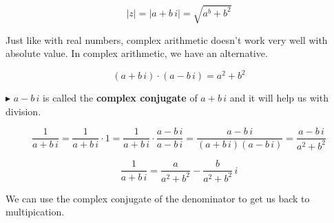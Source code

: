 \documentclass{ximera}
\begin{document}
\[    |z| = |a + b \, i| = \sqrt{a^b + b^2}          \]



Just like with real numbers, complex arithmetic doesn't work very well with absolute value. In complex arithmetic, we have an alternative.



\[   (a + b \, i) \cdot    (a - b \, i)  = a^2 + b^2   \]



$\blacktriangleright$  $a - b \, i$ is called the \textbf{complex conjugate} of $a + b \, i$ and it will help us with division.




\[   \frac{1}{a + b \, i} =   \frac{1}{a + b \, i} \cdot 1 = \frac{1}{a + b \, i} \cdot \frac{a - b \, i}{a - b \, i}  =  \frac{a - b \, i}{(a + b \, i)(a - b \, i)} =   \frac{a - b \, i}{a^2 + b^2}  \]


\[  \frac{1}{a + b \, i}   =  \frac{a}{a^2 + b^2} - \frac{b}{a^2 + b^2} \, i      \]


We can use the complex conjugate of the denominator to get us back to multipication.
\end{document}
